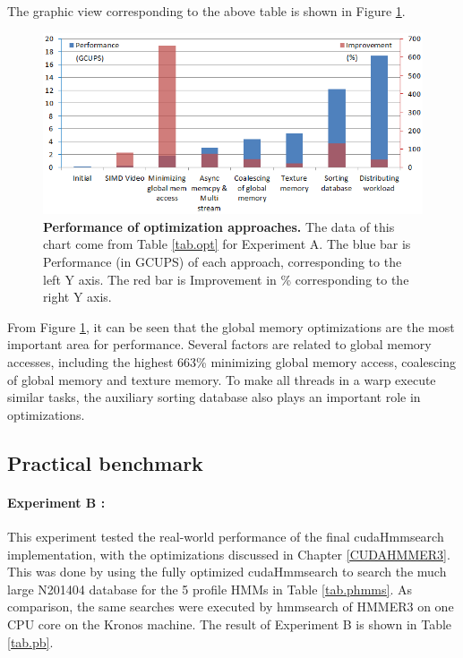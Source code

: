 The graphic view corresponding to the above table is shown in Figure \ref{fig:imp}. 

\begin{figure}[!htb]
	\centering
	\includegraphics[totalheight=0.28\textheight]{Figures/improve.png}
	\caption{\selectfont \textbf{Performance of optimization approaches.} The data of this chart come from Table \ref{tab.opt} for Experiment A. The blue bar is Performance (in GCUPS) of each approach, corresponding to the left Y axis. The red bar is Improvement in \% corresponding to the right Y axis.}
	\label{fig:imp}
\end{figure}

From Figure \ref{fig:imp}, it can be seen that the global memory optimizations are the most important area for performance. Several factors are related to global memory accesses, including the highest 663\% minimizing global memory access, coalescing of global memory and texture memory. To make all threads in a warp execute similar tasks, the auxiliary sorting database also plays an important role in optimizations.

\subsection{Practical benchmark}
\label{Pbench}
\paragraph*{Experiment B : }This experiment tested the real-world performance of the final cudaHmmsearch implementation, with the optimizations discussed in Chapter \ref{CUDAHMMER3}. 
This was done by using the fully optimized cudaHmmsearch to search the much large N201404 database for the 5 profile HMMs in Table \ref{tab.phmms}. As comparison, the same searches were executed by hmmsearch of HMMER3 on one CPU core on the Kronos machine. The result of Experiment B is shown in Table \ref{tab.pb}.


